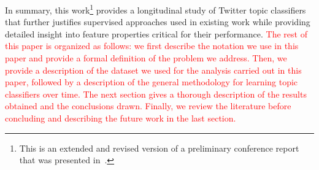In summary, this work\footnote{This is an extended and revised version of a preliminary conference report that was presented in~\cite{Iman2017}.} provides a longitudinal study of Twitter topic classifiers that further justifies supervised approaches used in existing work while providing detailed insight into feature properties critical for their performance. \textcolor{red}{ The rest of this paper is organized as follows: 
we first  describe the notation we use in this paper and provide a formal definition of the problem we address. Then, we provide a description of the dataset  we used for the analysis carried out in this paper, followed by a description of the general methodology for learning topic classifiers over time. The next section gives a thorough description of the results obtained and the conclusions drawn. Finally, we review the literature before concluding and describing the future work in the last section.}







%
%



